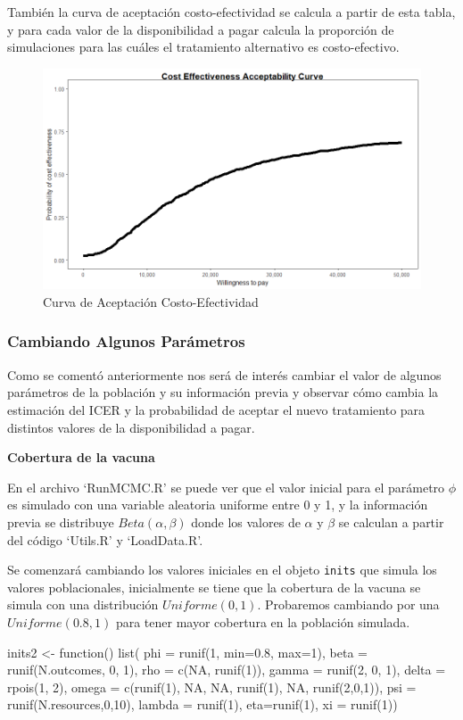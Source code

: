 \documentclass[12pt]{article}
\begin{document}
También la curva de aceptación costo-efectividad se calcula a partir de esta tabla, y para cada valor de la disponibilidad a pagar calcula la proporción de simulaciones para las cuáles el tratamiento alternativo es costo-efectivo.

\begin{figure}[H]
    \centering
    \includegraphics[width=.65\textwidth]{grafi/ceac_plot.jpg}
    \caption{Curva de Aceptación Costo-Efectividad}
    \label{fig:70}
\end{figure}



\subsubsection{Cambiando Algunos Parámetros}

Como se comentó anteriormente nos será de interés cambiar el valor de algunos parámetros de la población y su información previa y observar cómo cambia la estimación del ICER y la probabilidad de aceptar el nuevo tratamiento para distintos valores de la disponibilidad a pagar.

\begin{center}
    \textbf{Cobertura de la vacuna}
\end{center}

En el archivo `RunMCMC.R' se puede ver que el valor inicial para el parámetro $\phi$ es simulado con una variable aleatoria uniforme entre 0 y 1, y la información previa se distribuye $Beta(\alpha,\beta)$ donde los valores de $\alpha$ y $\beta$ se calculan a partir del código `Utils.R' y `LoadData.R'.

Se comenzará cambiando los valores iniciales en el objeto \texttt{inits} que simula los valores poblacionales, inicialmente se tiene que la cobertura de la vacuna se simula con una distribución $Uniforme(0,1)$. Probaremos cambiando por una $Uniforme(0.8,1)$ para tener mayor cobertura en la población simulada.

\begin{Rcode}
inits2 <- function(){
  list(
phi = runif(1, min=0.8, max=1), beta = runif(N.outcomes, 0, 1), rho = c(NA, runif(1)), gamma = runif(2, 0, 1), delta = rpois(1, 2), omega = c(runif(1), NA, NA, runif(1), NA, runif(2,0,1)), psi = runif(N.resources,0,10), lambda = runif(1), eta=runif(1), xi = runif(1))
}

\end{Rcode}
\end{document}
